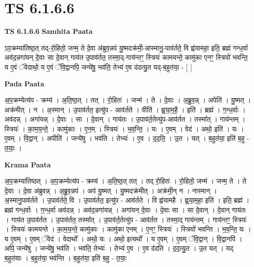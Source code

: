 \documentclass[17pt]{extarticle}
\begin{document}
\section{ TS 6.1.6.6 }

\textbf{TS 6.1.6.6 } \newline
\textbf{Samhita Paata} \newline

ऽप॒क्रम्या॑तिष्ठ॒त् तद्-रो॒हितो॒ जन्म॒ ते दे॒वा अ॑ब्रुव॒न्नप॑ यु॒ष्मदक्र॑मी॒-न्नास्मानु॒-पाव॑र्तते॒ वि ह्व॑यामहा॒ इति॒ ब्रह्म॑ गन्ध॒र्वा अव॑द॒न्नगा॑यन् दे॒वाः सा दे॒वान् गाय॑त उ॒पाव॑र्तत॒ तस्मा॒द्-गाय॑न्तꣳ॒॒ स्त्रियः॑ कामयन्ते॒ कामु॑का एनꣳ॒॒ स्त्रियो॑ भवन्ति॒ य ए॒वं ॅवेदाथो॒ य ए॒वं ॅवि॒द्वानपि॒ जन्ये॑षु॒ भव॑ति॒ तेभ्य॑ ए॒व द॑दत्यु॒त यद्-ब॒हुत॑या॒ - [  ] \newline

\textbf{Pada Paata} \newline

अ॒प॒क्रम्येत्य॑प - क्रम्य॑ । अ॒ति॒ष्ठ॒त् । तत् । रो॒हितः॑ । जन्म॑ । ते । दे॒वाः । अ॒ब्रु॒व॒न्न् । अपेति॑ । यु॒ष्मत् । अक्र॑मीत् । न । अ॒स्मान् । उ॒पाव॑र्तत॒ इत्यु॑प - आव॑र्तते । वीति॑ । ह्व॒या॒म॒है॒ । इति॑ । ब्रह्म॑ । ग॒न्ध॒र्वाः । अव॑दन्न् । अगा॑यन्न् । दे॒वाः । सा । दे॒वान् । गाय॑तः । उ॒पाव॑र्त॒तेत्यु॑प-आव॑र्तत । तस्मा᳚त् । गाय॑न्तम् । स्त्रियः॑ । का॒म॒य॒न्ते॒ । कामु॑काः । ए॒न॒म् । स्त्रियः॑ । भ॒व॒न्ति॒ । यः । ए॒वम् । वेद॑ । अथो॒ इति॑ । यः । ए॒वम् । वि॒द्वान् । अपीति॑ । जन्ये॑षु । भव॑ति । तेभ्यः॑ । ए॒व । द॒द॒ति॒ । उ॒त । यत् । ब॒हुत॑या॒ इति॑ ब॒हु - त॒याः॒ ।  \newline


\textbf{Krama Paata} \newline

अ॒प॒क्रम्या॑तिष्ठत् । अ॒प॒क्रम्येत्य॑प - क्रम्य॑ । अ॒ति॒ष्ठ॒त् तत् । तद् रो॒हितः॑ । रो॒हितो॒ जन्म॑ । जन्म॒ ते । ते दे॒वाः । दे॒वा अ॑ब्रुवन्न् । अ॒ब्रु॒व॒न्नप॑ । अप॑ यु॒ष्मत् । यु॒ष्मदक्र॑मीत् । अक्र॑मी॒न् न । नास्मान् । अ॒स्मानु॒पाव॑र्तते । उ॒पाव॑र्तते॒ वि । उ॒पाव॑र्तत॒ इत्यु॑प - आव॑र्तते । वि ह्व॑यामहै । ह्व॒या॒म॒हा॒ इति॑ । इति॒ ब्रह्म॑ । ब्रह्म॑ गन्ध॒र्वाः । ग॒न्ध॒र्वा अव॑दन्न् । अव॑द॒न्नगा॑यन्न् । अगा॑यन् दे॒वाः । दे॒वाः सा । सा दे॒वान् । दे॒वान् गाय॑तः । गाय॑त उ॒पाव॑र्तत । उ॒पाव॑र्तत॒ तस्मा᳚त् । उ॒पाव॑र्त॒तेत्यु॑प - आव॑र्तत । तस्मा॒द् गाय॑न्तम् । गाय॑न्तꣳ॒॒ स्त्रियः॑ । स्त्रियः॑ कामयन्ते । का॒म॒य॒न्ते॒ कामु॑काः । कामु॑का एनम् । ए॒नꣳ॒॒ स्त्रियः॑ । स्त्रियो॑ भवन्ति । भ॒व॒न्ति॒ यः । य ए॒वम् । ए॒वम् ॅवेद॑ । वेदाथो᳚ । अथो॒ यः । अथो॒ इत्यथो᳚ । य ए॒वम् । ए॒वम् ॅवि॒द्वान् । वि॒द्वानपि॑ । अपि॒ जन्ये॑षु । जन्ये॑षु॒ भव॑ति । भव॑ति॒ तेभ्यः॑ । तेभ्य॑ ए॒व । ए॒व द॑दति । द॒द॒त्यु॒त । उ॒त यत् । यद् ब॒हुत॑याः । ब॒हुत॑या॒ भव॑न्ति । ब॒हुत॑या॒ इति॑ ब॒हु - त॒याः॒ \newline
\end{document}
